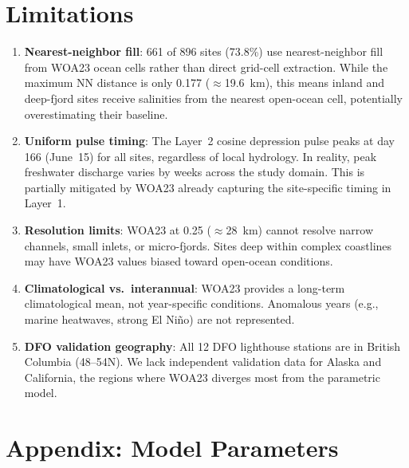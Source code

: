 \documentclass[11pt,letterpaper]{article}
\begin{document}
\section{Limitations}

\begin{enumerate}
    \item \textbf{Nearest-neighbor fill}: 661 of 896 sites (73.8\%)
    use nearest-neighbor fill from WOA23 ocean cells rather than
    direct grid-cell extraction. While the maximum NN distance is only
    0.177\textdegree{} ($\approx$19.6~km), this means inland and
    deep-fjord sites receive salinities from the nearest open-ocean
    cell, potentially overestimating their baseline.

    \item \textbf{Uniform pulse timing}: The Layer~2 cosine depression
    pulse peaks at day 166 (June~15) for all sites, regardless of local
    hydrology. In reality, peak freshwater discharge varies by weeks
    across the study domain. This is partially mitigated by WOA23
    already capturing the site-specific timing in Layer~1.

    \item \textbf{Resolution limits}: WOA23 at 0.25\textdegree{}
    ($\approx$28~km) cannot resolve narrow channels, small inlets,
    or micro-fjords. Sites deep within complex coastlines may have
    WOA23 values biased toward open-ocean conditions.

    \item \textbf{Climatological vs.\ interannual}: WOA23 provides a
    long-term climatological mean, not year-specific conditions.
    Anomalous years (e.g., marine heatwaves, strong El Ni\~{n}o)
    are not represented.

    \item \textbf{DFO validation geography}: All 12 DFO lighthouse
    stations are in British Columbia (48--54\textdegree{}N). We lack
    independent validation data for Alaska and California, the regions
    where WOA23 diverges most from the parametric model.
\end{enumerate}

\section*{Appendix: Model Parameters}
\end{document}
